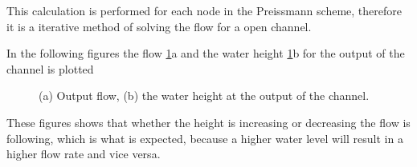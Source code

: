 This calculation is performed for each node in the Preissmann scheme, therefore it is a iterative method of solving the flow for a open channel. 


In the following figures the flow \ref{fig:simulation_output_flow_height}a and the water height \ref{fig:simulation_output_flow_height}b for the output of the channel is plotted


\begin{figure}[H]
\centering
\begin{subfigure}{.5\textwidth}
  \centering
  
  \caption{}
\end{subfigure}%
\begin{subfigure}{.4\textwidth}
  \centering
 
  \caption{}
\end{subfigure}
\caption{(a) Output flow, (b) the water height at the output of the channel.}
\label{fig:simulation_output_flow_height}
\end{figure}

These figures shows that whether the height is increasing or decreasing the flow is following, which is what is expected, because a higher water level will result in a higher flow rate and vice versa. 


